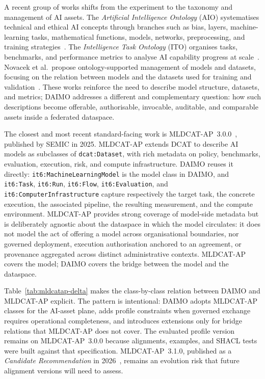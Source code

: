 \documentclass[Afour,sagev,times]{sagej}
\newcommand{\code}[1]{\texttt{#1}}
\begin{document}
A recent group of works shifts from the experiment to the taxonomy and management of AI assets. The \emph{Artificial Intelligence Ontology} (AIO) systematises technical and ethical AI concepts through branches such as bias, layers, machine-learning tasks, mathematical functions, models, networks, preprocessing, and training strategies~\cite{aio}. The \emph{Intelligence Task Ontology} (ITO) organises tasks, benchmarks, and performance metrics to analyse AI capability progress at scale~\cite{ito}. Novacek et al.\ propose ontology-supported management of models and datasets, focusing on the relation between models and the datasets used for training and validation~\cite{novacek24}. These works reinforce the need to describe model structure, datasets, and metrics; DAIMO addresses a different and complementary question: how such descriptions become offerable, authorisable, invocable, auditable, and comparable assets inside a federated dataspace.

The closest and most recent standard-facing work is MLDCAT-AP~3.0.0~\cite{mldcatap}, published by SEMIC in 2025. MLDCAT-AP extends DCAT to describe AI models as subclasses of \code{dcat:Dataset}, with rich metadata on policy, benchmarks, evaluation, execution, risk, and compute infrastructure. DAIMO reuses it directly: \code{it6:MachineLearningModel} is the model class in DAIMO, and \code{it6:Task}, \code{it6:Run}, \code{it6:Flow}, \code{it6:Evaluation}, and \code{it6:ComputerInfrastructure} capture respectively the target task, the concrete execution, the associated pipeline, the resulting measurement, and the compute environment. MLDCAT-AP provides strong coverage of model-side metadata but is deliberately agnostic about the dataspace in which the model circulates: it does not model the act of offering a model across organisational boundaries, nor governed deployment, execution authorisation anchored to an agreement, or provenance aggregated across distinct administrative contexts. MLDCAT-AP covers the model; DAIMO covers the bridge between the model and the dataspace.

Table~\ref{tab:mldcatap-delta} makes the class-by-class relation between DAIMO and MLDCAT-AP explicit. The pattern is intentional: DAIMO adopts MLDCAT-AP classes for the AI-asset plane, adds profile constraints when governed exchange requires operational completeness, and introduces extensions only for bridge relations that MLDCAT-AP does not cover. The evaluated profile version remains on MLDCAT-AP~3.0.0 because alignments, examples, and SHACL tests were built against that specification. MLDCAT-AP~3.1.0, published as a \emph{Candidate Recommendation} in 2026~\cite{mldcatap31}, remains an evolution risk that future alignment versions will need to assess.
\end{document}
